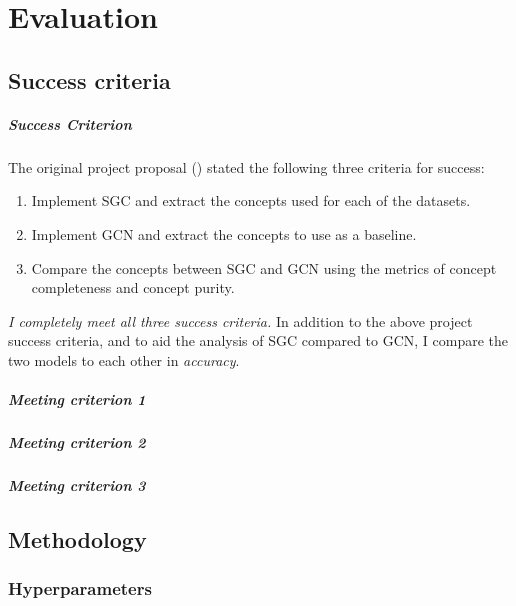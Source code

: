 \chapter{Evaluation}

\section{Success criteria}

\paragraph{Success Criterion}
The original project proposal () stated the following three criteria for success:
\begin{enumerate}
    \item Implement SGC and extract the concepts used for each of the datasets.
    \item Implement GCN and extract the concepts to use as a baseline.
    \item Compare the concepts between SGC and GCN using the metrics of concept completeness and concept purity.
\end{enumerate}

\emph{I completely meet all three success criteria.}
In addition to the above project success criteria, and to aid the analysis of SGC compared to GCN, 
I compare the two models to each other in \emph{accuracy}.

\paragraph{Meeting criterion 1}

\paragraph{Meeting criterion 2}

\paragraph{Meeting criterion 3}

\section{Methodology}

\subsection{Hyperparameters}

